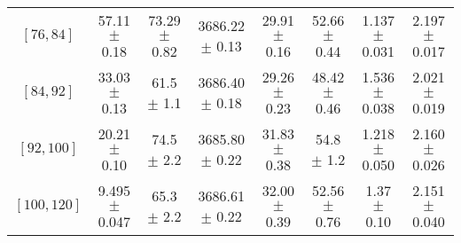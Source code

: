 \begin{tabular}{c||c|c|c|c|c|c|c}
$[76, 84]$ & 57.11 $\pm$ 0.18 & 73.29 $\pm$ 0.82 & 3686.22 $\pm$ 0.13 & 29.91 $\pm$ 0.16 & 52.66 $\pm$ 0.44 & 1.137 $\pm$ 0.031 & 2.197 $\pm$ 0.017\\
$[84, 92]$ & 33.03 $\pm$ 0.13 & 61.5 $\pm$ 1.1 & 3686.40 $\pm$ 0.18 & 29.26 $\pm$ 0.23 & 48.42 $\pm$ 0.46 & 1.536 $\pm$ 0.038 & 2.021 $\pm$ 0.019\\
$[92, 100]$ & 20.21 $\pm$ 0.10 & 74.5 $\pm$ 2.2 & 3685.80 $\pm$ 0.22 & 31.83 $\pm$ 0.38 & 54.8 $\pm$ 1.2 & 1.218 $\pm$ 0.050 & 2.160 $\pm$ 0.026\\
$[100, 120]$ & 9.495 $\pm$ 0.047 & 65.3 $\pm$ 2.2 & 3686.61 $\pm$ 0.22 & 32.00 $\pm$ 0.39 & 52.56 $\pm$ 0.76 & 1.37 $\pm$ 0.10 & 2.151 $\pm$ 0.040\\
\end{tabular}

